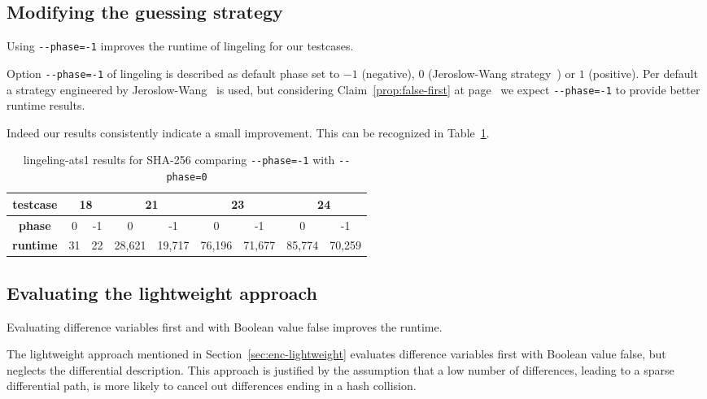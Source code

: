 \subsection{Modifying the guessing strategy}
\label{sec:results-guessing}
%
\newcommand\mone[1][-1]{\texttt{-{}-phase=#1}}
\begin{prop}
  Using \mone{} improves the runtime of lingeling for our testcases.
\end{prop}
%
Option \mone{} of lingeling is described as default phase set to
$-1$ (negative), $0$ (Jeroslow-Wang strategy~\cite{JeroslowWang})
or $1$ (positive). Per default a strategy engineered by
Jeroslow-Wang~\cite{JeroslowWang} is used, but considering
Claim~\ref{prop:false-first} at page~\pageref{prop:false-first}
we expect \mone{} to provide better runtime results.

Indeed our results consistently indicate a small improvement.
This can be recognized in Table~\ref{tab:phase-results}.

\begin{table}[!h]
  \begin{center}
    \begin{tabular}{c|cc cc cc cc}
      \textbf{testcase} & \multicolumn{2}{c}{18} & \multicolumn{2}{c}{21} & \multicolumn{2}{c}{23} & \multicolumn{2}{c}{24} \\
    \hline
      \textbf{phase}    &       0 &     -1 &       0 &     -1 &       0 &     -1 &       0 &     -1 \\
    \hline
      \textbf{runtime}  &      31 &     22 &  28,621 & 19,717 &  76,196 & 71,677 & 85,774  & 70,259 \\
    \end{tabular}
    \caption{lingeling-ats1 results for SHA-256 comparing \mone{} with \mone[0]{}}
    \label{tab:phase-results}
  \end{center}
\end{table}

\subsection{Evaluating the lightweight approach}
\label{sec:lightweight-results}
%
\begin{prop}
  Evaluating difference variables first and with Boolean value false improves the runtime.
\end{prop}
%
The lightweight approach mentioned in Section~\ref{sec:enc-lightweight}
evaluates difference variables first with Boolean value false,
but neglects the differential description.
This approach is justified by the assumption that a low number of differences,
leading to a sparse differential path, is more likely to cancel out differences
ending in a hash collision.

